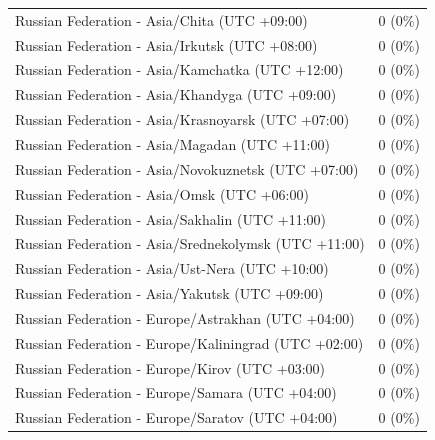 \begin{appendix}
\begin{table}
{\begin{tabular}[t]{ll}
\hspace{1em}Russian Federation - Asia/Chita (UTC +09:00) & 0 (0\%)\\
\hspace{1em}Russian Federation - Asia/Irkutsk (UTC +08:00) & 0 (0\%)\\
\addlinespace
\hspace{1em}Russian Federation - Asia/Kamchatka (UTC +12:00) & 0 (0\%)\\
\hspace{1em}Russian Federation - Asia/Khandyga (UTC +09:00) & 0 (0\%)\\
\hspace{1em}Russian Federation - Asia/Krasnoyarsk (UTC +07:00) & 0 (0\%)\\
\hspace{1em}Russian Federation - Asia/Magadan (UTC +11:00) & 0 (0\%)\\
\hspace{1em}Russian Federation - Asia/Novokuznetsk (UTC +07:00) & 0 (0\%)\\
\addlinespace
\hspace{1em}Russian Federation - Asia/Omsk (UTC +06:00) & 0 (0\%)\\
\hspace{1em}Russian Federation - Asia/Sakhalin (UTC +11:00) & 0 (0\%)\\
\hspace{1em}Russian Federation - Asia/Srednekolymsk (UTC +11:00) & 0 (0\%)\\
\hspace{1em}Russian Federation - Asia/Ust-Nera (UTC +10:00) & 0 (0\%)\\
\hspace{1em}Russian Federation - Asia/Yakutsk (UTC +09:00) & 0 (0\%)\\
\addlinespace
\hspace{1em}Russian Federation - Europe/Astrakhan (UTC +04:00) & 0 (0\%)\\
\hspace{1em}Russian Federation - Europe/Kaliningrad (UTC +02:00) & 0 (0\%)\\
\hspace{1em}Russian Federation - Europe/Kirov (UTC +03:00) & 0 (0\%)\\
\hspace{1em}Russian Federation - Europe/Samara (UTC +04:00) & 0 (0\%)\\
\hspace{1em}Russian Federation - Europe/Saratov (UTC +04:00) & 0 (0\%)\\

\end{tabular}}
\end{table}
\end{appendix}
